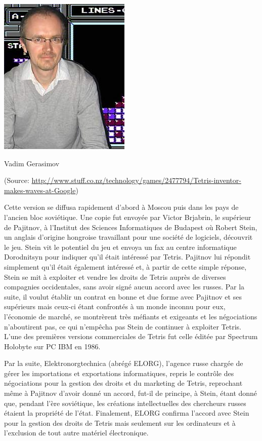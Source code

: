 \begin{center}
	\includegraphics[scale=0.7]{../media/Gerasimov.jpg}
	
	Vadim Gerasimov
	
	(Source:   \url{http://www.stuff.co.nz/technology/games/2477794/Tetris-inventor-makes-waves-at-Google})
\end{center}

Cette version se diffusa rapidement d'abord à Moscou puis dans les pays de l'ancien bloc soviétique. Une copie fut envoyée par Victor Brjabrin, le supérieur de Pajitnov, à l'Institut des Sciences Informatiques de Budapest où Robert Stein, un anglais d'origine hongroise travaillant pour une société de logiciels, découvrit le jeu. Stein vit le potentiel du jeu et envoya un fax au centre informatique Dorodnitsyn pour indiquer qu'il était intéressé par Tetris. Pajitnov lui répondit simplement qu'il était également intéressé et, à partir de cette simple réponse, Stein se mit à exploiter et vendre les droits de Tetris auprès de diverses compagnies occidentales, sans avoir signé aucun accord avec les russes. Par la suite, il voulut établir un contrat en bonne et due forme avec Pajitnov et ses supérieurs mais ceux-ci étant confrontés à un monde inconnu pour eux, l'économie de marché, se montrèrent très méfiants et exigeants et les négociations n'aboutirent pas, ce qui n'empêcha pas Stein de continuer à exploiter Tetris. L'une des premières versions commerciales de Tetris fut celle éditée par Spectrum  Holobyte sur PC IBM en 1986. 

Par la suite, Elektronorgtechnica (abrégé ELORG), l'agence russe chargée de gérer les importations et exportations informatiques, repris le contrôle des négociations pour la gestion des droits et du marketing de Tetris, reprochant même à Pajitnov d'avoir donné un accord, fut-il de principe, à Stein, étant donné que, pendant l'ère soviétique, les créations intellectuelles des chercheurs russes étaient la propriété de l'état. Finalement, ELORG confirma l'accord avec Stein pour la gestion des droits de Tetris mais seulement sur les ordinateurs et à l'exclusion de tout autre matériel électronique. 

